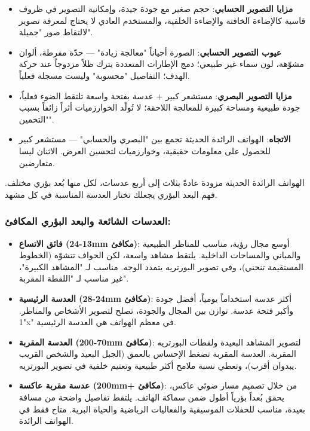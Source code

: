 \begin{itemize}
  \item \textbf{مزايا التصوير الحسابي}: حجم صغير مع جودة جيدة، وإمكانية التصوير في ظروف قاسية كالإضاءة الخافتة والإضاءة الخلفية، والمستخدم العادي لا يحتاج لمعرفة تصوير لالتقاط صور "جميلة".
  \item \textbf{عيوب التصوير الحسابي}: الصورة أحياناً "معالجة زيادة" — حدّة مفرطة، ألوان مشوّهة، لون سماء غير طبيعي؛ دمج الإطارات المتعددة يترك ظلاً مزدوجاً عند حركة الهدف؛ التفاصيل "محسوبة" وليست مسجلة فعلياً.
  \item \textbf{مزايا التصوير البصري}: مستشعر كبير + عدسة بفتحة واسعة تلتقط الضوء فعلياً، جودة طبيعية ومساحة كبيرة للمعالجة اللاحقة؛ لا تُولّد الخوارزميات أثراً زائفاً بسبب "التخمين".
  \item \textbf{الاتجاه}: الهواتف الرائدة الحديثة تجمع بين "البصري والحسابي" — مستشعر كبير للحصول على معلومات حقيقية، وخوارزميات لتحسين العرض. الاثنان ليسا متعارضين.
\end{itemize}


الهواتف الرائدة الحديثة مزودة عادةً بثلاث إلى أربع عدسات، لكل منها بُعد بؤري مختلف. فهم البعد البؤري يجعلك تختار العدسة المناسبة في كل مشهد.

\subsubsection*{العدسات الشائعة والبعد البؤري المكافئ:}

\begin{itemize}
  \item \textbf{فائق الاتساع (13-24mm مكافئ)}: أوسع مجال رؤية، مناسب للمناظر الطبيعية والمباني والمساحات الداخلية. يلتقط مشاهد واسعة، لكن الحواف تتشوّه (الخطوط المستقيمة تنحني)، وفي تصوير البورتريه يتمدد الوجه. مناسب لـ "المشاهد الكبيرة"، غير مناسب لـ "اللقطة المقربة".
  \item \textbf{العدسة الرئيسية (24-28mm مكافئ)}: أكثر عدسة استخداماً يومياً، أفضل جودة وأكبر فتحة عدسة. توازن بين المجال والجودة، تصلح لتصوير الأشخاص والمناظر. "1x" في معظم الهواتف هي العدسة الرئيسية.
  \item \textbf{العدسة المقربة (70-200mm مكافئ)}: لتصوير المشاهد البعيدة ولقطات البورتريه المقربة. العدسة المقربة تضغط الإحساس بالعمق (الجبل البعيد والشخص القريب يبدوان أقرب)، وتعطي نسبة ملامح أكثر طبيعية وتعتيم خلفية في تصوير البورتريه.
  \item \textbf{عدسة مقربة عاكسة (200mm+ مكافئ)}: من خلال تصميم مسار ضوئي عاكس، يحقق بُعداً بؤرياً أطول ضمن سماكة الهاتف. يلتقط تفاصيل واضحة من مسافة بعيدة، مناسب للحفلات الموسيقية والفعاليات الرياضية والحياة البرية. متاح فقط في الهواتف الرائدة.
\end{itemize}

